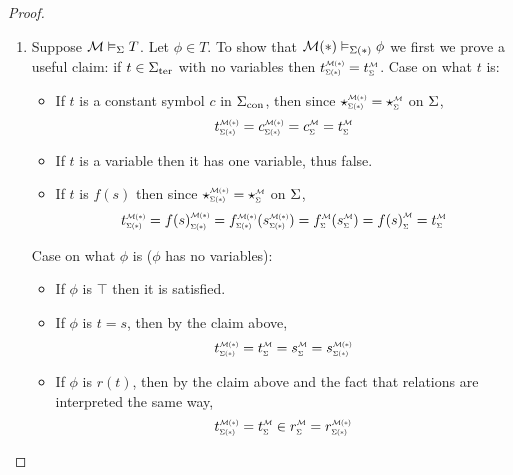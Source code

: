\begin{proof}~
    \begin{enumerate}
        \item Suppose $\mathcal{M} \vDash_{\Sigma} T$.
        Let $\phi \in T$.
        To show that 
        $\mathcal{M}(*) \vDash_{\Sigma(*)} \phi$ we
        first we prove a useful claim:
        if $t \in {\Sigma}_\mathrm{ter}$ with no variables then 
        $\subintp{\Si(*)}{\MM(*)}{t} = \subintp{\Si}{\MM}{t}$.
        Case on what $t$ is:
        \begin{itemize}
            \item If $t$ is a constant symbol $c$ in ${\Sigma}_\mathrm{con}$, 
                then since $\intp{\Si(*)}{\MM(*)} = 
                    \intp{\Si}{\MM}$ on $\Sigma$,
                \[\subintp{\Si(*)}{\MM(*)}{t} = 
                    \subintp{\Si(*)}{\MM(*)}{c} =
                    \subintp{\Si}{\MM}{c} =
                    \subintp{\Si}{\MM}{t}\]
            \item If $t$ is a variable then it has one variable,
            thus false.
            \item If $t$ is $f(s)$ then since 
            $\intp{\Si(*)}{\MM(*)} = 
            \intp{\Si}{\MM}$ on $\Sigma$,
            \[
                \subintp{\Si(*)}{\MM(*)}{t} =
                \subintp{\Si(*)}{\MM(*)}{f(s)} =
                \subintp{\Si(*)}{\MM(*)}{f}(\subintp{\Si(*)}{\MM(*)}{s}) =
                \subintp{\Si}{\MM}{f}(\subintp{\Si}{\MM}{s}) =
                \subintp{\Si}{\MM}{f(s)} =
                \subintp{\Si}{\MM}{t}
            \]
        \end{itemize}
        Case on what $\phi$ is ($\phi$ has no variables):
        \begin{itemize}
            \item {If $\phi$ is $\top$ then it is satisfied.}
            \item If $\phi$ is $t = s$, 
                then by the claim above,
                \[
                    \subintp{\Si(*)}{\MM(*)}{t} = 
                    \subintp{\Si}{\MM}{t} = 
                    \subintp{\Si}{\MM}{s} = 
                    \subintp{\Si(*)}{\MM(*)}{s}
                \]
            \item If $\phi$ is $r(t)$,
                then by the claim above
                and the fact that relations are interpreted the same way,
                \[
                    \subintp{\Si(*)}{\MM(*)}{t} = 
                    \subintp{\Si}{\MM}{t} \in
                    \subintp{\Si}{\MM}{r} = 
                    \subintp{\Si(*)}{\MM(*)}{r}
\]
\end{itemize}
\end{enumerate}
\end{proof}
